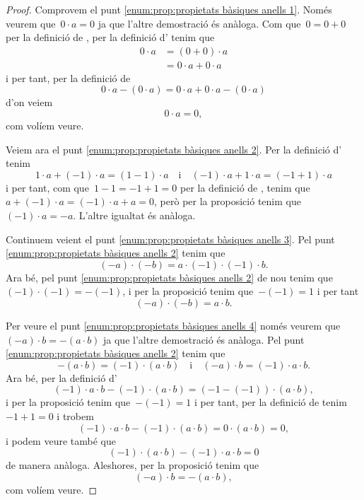 \documentclass[../../main.tex]{subfiles}
\begin{document}
    \begin{proof}
        Comprovem el punt \eqref{enum:prop:propietats bàsiques anells 1}.
        Només veurem que~\(0\cdot a=0\) ja que l'altre demostració és anàloga.
        Com que~\(0=0+0\) per la definició de , per la definició d' tenim que
        \begin{align*}
        0\cdot a&=(0+0)\cdot a\\
        &=0\cdot a+0\cdot a
        \end{align*}
        i per tant, per la definició de 
        \[
            0\cdot a-(0\cdot a)=0\cdot a+0\cdot a-(0\cdot a)
        \]
        d'on veiem
        \[
            0\cdot a=0,
        \]
        com volíem veure.

        Veiem ara el punt \eqref{enum:prop:propietats bàsiques anells 2}.
        Per la definició d' tenim
        \[
            1\cdot a+(-1)\cdot a=(1-1)\cdot a\quad\text{i}\quad(-1)\cdot a+1\cdot a=(-1+1)\cdot a
        \]
        i per tant, com que~\(1-1=-1+1=0\) per la definició de , tenim que~\(a+(-1)\cdot a=(-1)\cdot a+a=0\), però per la proposició  tenim que~\((-1)\cdot a=-a\).
        L'altre igualtat és anàloga.

        Continuem veient el punt \eqref{enum:prop:propietats bàsiques anells 3}.
        Pel punt \eqref{enum:prop:propietats bàsiques anells 2} tenim que
        \[
            (-a)\cdot(-b)=a\cdot (-1)\cdot(-1)\cdot b.
        \]
        Ara bé, pel punt \eqref{enum:prop:propietats bàsiques anells 2} de nou tenim que~\((-1)\cdot(-1)=-(-1)\), i per la proposició  tenim que~\(-(-1)=1\) i per tant
        \[
            (-a)\cdot(-b)=a\cdot b.
        \]

        Per veure el punt \eqref{enum:prop:propietats bàsiques anells 4} només veurem que~\((-a)\cdot b=-(a\cdot b)\) ja que l'altre demostració és anàloga.
        Pel punt \eqref{enum:prop:propietats bàsiques anells 2} tenim que
        \[
            -(a\cdot b)=(-1)\cdot(a\cdot b)\quad{\text{i}}\quad(-a)\cdot b=(-1)\cdot a\cdot b.
        \]
        Ara bé, per la definició d'
        \[
            (-1)\cdot a\cdot b-(-1)\cdot(a\cdot b)=(-1-(-1))\cdot(a\cdot b),
        \]
        i per la proposició  tenim que~\(-(-1)=1\) i per tant, per la definició de  tenim~\(-1+1=0\) i trobem
        \[
            (-1)\cdot a\cdot b-(-1)\cdot(a\cdot b)=0\cdot(a\cdot b)=0,
        \]
        i podem veure també que
        \[
            (-1)\cdot(a\cdot b)-(-1)\cdot a\cdot b=0
        \]
        de manera anàloga.
        Aleshores, per la proposició  tenim que
        \[
            (-a)\cdot b=-(a\cdot b),
        \]
        com volíem veure.
    \end{proof}
\end{document}
